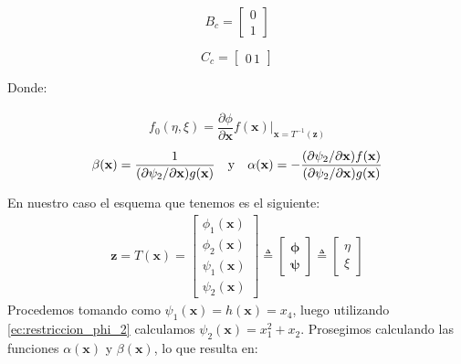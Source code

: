 \documentclass[10pt]{article}
\begin{document}
\begin{equation}
B_{c}=
\begin{bmatrix}
  0\\ 
  1 
\end{bmatrix}
\end{equation}

\begin{equation}
C_{c}=
\begin{bmatrix}
  0 \, 1 
\end{bmatrix}
\end{equation}

Donde:

%
\begin{align}
    f_{0}(\eta,\xi) = \dfrac{\partial \phi}{\partial \mathbf{x}}f(\mathbf{x})\vert_{\mathbf{x}=T^{-1}(\mathbf{z})}
\label{ec:fsubcero}
\end{align}
%
%
\begin{align}
\begin{array}{rcl}
    \beta(\mathbf{x}) = \dfrac{1}{(\partial \psi_{2} / \partial \mathbf{x} ) g(\mathbf{x}) } & \textnormal{y} & \alpha(\mathbf{x}) = - \dfrac{(\partial \psi_{2} / \partial \mathbf{x}) f(\mathbf{x})}{(\partial \psi_{2} / \partial \mathbf{x}) g(\mathbf{x})}
\end{array}
\label{alfaybeta}
\end{align}

En nuestro caso el esquema que tenemos es el siguiente:
\begin{align}
    \mathbf{z} = T(\mathbf{x}) = \begin{bmatrix} \phi_{1}(\mathbf{x}) \\ \phi_{2}(\mathbf{x}) \\ \psi_{1}(\mathbf{x})  \\ \psi_{2}(\mathbf{x})\end{bmatrix} \triangleq \begin{bmatrix}\mathbf{\phi} \\ \mathbf{\psi} \end{bmatrix} \triangleq \begin{bmatrix} \eta \\ \xi \end{bmatrix}
\label{ec:difeo_aumentado}
\end{align}
%
Procedemos tomando como $\psi_{1}(\mathbf{x})=h(\mathbf{x})=x_{4}$, luego utilizando \eqref{ec:restriccion_phi_2} calculamos $\psi_{2}(\mathbf{x})=x_{1}^{2}+x_{2}$. Prosegimos calculando las funciones $\alpha(\mathbf{x})$ y $\beta(\mathbf{x})$, lo que resulta en:
\end{document}
